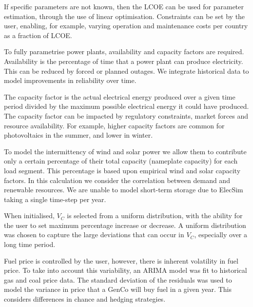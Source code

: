 If specific parameters are not known, then the LCOE can be used for parameter estimation, through the use of linear optimisation. Constraints can be set by the user, enabling, for example, varying operation and maintenance costs per country as a fraction of LCOE.

To fully parametrise power plants, availability and capacity factors are required. Availability is the percentage of time that a power plant can produce electricity. This can be reduced by forced or planned outages. We integrate historical data to model improvements in reliability over time.

The capacity factor is the actual electrical energy produced over a given time period divided by the maximum possible electrical energy it could have produced. The capacity factor can be impacted by regulatory constraints, market forces and resource availability. For example, higher capacity factors are common for photovoltaics in the summer, and lower in winter. 

To model the intermittency of wind and solar power we allow them to contribute only a certain percentage of their total capacity (nameplate capacity) for each load segment. This percentage is based upon empirical wind and solar capacity factors. In this calculation we consider the correlation between demand and renewable resources. We are unable to model short-term storage due to ElecSim taking a single time-step per year. 

When initialised, $V_C$ is selected from a uniform distribution, with the ability for the user to set maximum percentage increase or decrease. A uniform distribution was chosen to capture the large deviations that can occur in $V_C$, especially over a long time period. \vphantom{By doing this, the variance in costs between individual power plants for processes such as preventative and corrective maintenance, labour costs and skill, health and safety and chance are different per plant instant.}

Fuel price is controlled by the user, however, there is inherent volatility in fuel price. To take into account this variability, an ARIMA \cite{ARIMA} model was fit to historical gas and coal price data. The standard deviation of the residuals was used to model the variance in price that a GenCo will buy fuel in a given year. This considers differences in chance and hedging strategies.



